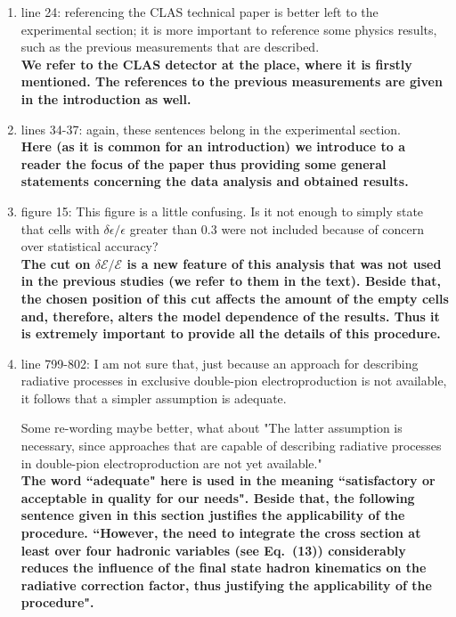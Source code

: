 \documentclass[,superscriptaddress,showpacs,amssymb,amsmath,amsfonts,linenumbers,article]{revtex4-1}
\begin{document}
\begin{enumerate}


\item line 24: referencing the CLAS technical paper is better left to the experimental section; it is more important to reference some physics results, such as the previous measurements that are described.\\
{\bf We refer to the CLAS detector at the place, where it is firstly mentioned. The references to the previous measurements are given in the introduction as well.}

\item lines 34-37: again, these sentences belong in the experimental section.\\
{\bf Here (as it is common for an introduction) we introduce to a reader the focus of the paper thus providing some general statements concerning the data analysis and obtained results.}

\item figure 15: This figure is a little confusing. Is it not enough to simply state that cells with $\delta\epsilon/\epsilon$ greater than 0.3 were not included because of concern over statistical accuracy?\\
{\bf The cut on $\delta\mathcal{E}/\mathcal{E}$ is a new feature of this analysis that was not used in the previous studies (we refer to them in the text). Beside that, the chosen position of this cut affects the amount of the empty cells and, therefore, alters the model dependence of the results. Thus it is extremely important to provide all the details of this procedure.}

\item line 799-802: I am not sure that, just because an approach for describing radiative processes in exclusive double-pion electroproduction is not available, it follows that a simpler assumption is adequate.

Some re-wording maybe better, what about "The latter assumption is necessary, since approaches that are capable of describing radiative processes in double-pion electroproduction are not yet available."\\
{\bf The word ``adequate" here is used in the meaning ``satisfactory or acceptable in quality for our needs". Beside that, the following sentence given in this section justifies the applicability of the procedure. ``However, 
the need to integrate the cross section at least over four hadronic variables (see Eq.~(13)) considerably reduces the influence of the final state hadron kinematics on the radiative correction factor, thus justifying  the applicability of the procedure". }


\end{enumerate}
\end{document}
